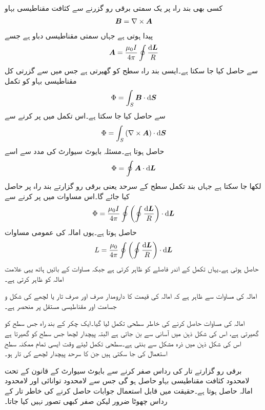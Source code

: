 کسی بھی بند راہ پر یک سمتی برقی رو  گزرنے سے کثافت مقناطیسی بہاو 
\begin{align*}
{\ensuremath{{\boldsymbol{B}}}}=\nabla \times {\ensuremath{{\boldsymbol{A}}}}
\end{align*}
 پیدا ہوتی  ہے جہاں  سمتی مقناطیسی دباو ہے جسے
\begin{align*}
\kvec{A}=\frac{\mu_0 I}{4\pi}\oint \frac{\dif \kvec{L}}{R}
\end{align*}
سے حاصل کیا جا سکتا ہے۔ایسی بند راہ سطح  کو گھیرتی ہے جس میں سے گزرتی کل مقناطیسی بہاو   کو تکمل
\begin{align*}
\Phi=\int_S \kvec{B} \cdot \dif \kvec{S}
\end{align*}
سے حاصل کیا جا سکتا ہے۔اس تکمل میں  پر کرنے سے
\begin{align*}
\Phi=\int_S \left(\nabla \times \kvec{A}  \right) \cdot \dif \kvec{S}
\end{align*}   
حاصل ہوتا ہے۔مسئلہ بایوٹ سیوارٹ کی مدد سے اسے
\begin{align*}
\Phi=\oint \kvec{A} \cdot \dif \kvec{L}
\end{align*}
لکھا جا سکتا ہے جہاں بند تکمل سطح کے سرحد یعنی برقی رو گزارتے بند راہ پر حاصل کیا جائے گا۔اس مساوات میں  پر کرنے سے
\begin{align*}
\Phi=\frac{\mu_0 I}{4\pi}\oint\left(\oint \frac{\dif \kvec{L}}{R} \right) \cdot \dif \kvec{L}
\end{align*}
حاصل ہوتا ہے۔یوں امالہ کی عمومی مساوات 
\begin{align}
L=\frac{\mu_0 }{4\pi}\oint\left(\oint \frac{\dif \kvec{L}}{R} \right) \cdot \dif \kvec{L}
\end{align}
حاصل ہوتی ہے۔یہاں تکمل کے اندر  فاصلے کو ظاہر کرتی ہے جبکہ مساوات کے بائیں ہاتھ یہی علامت امالہ کو ظاہر کرتی ہے۔

امالہ کی مساوات سے ظاہر ہے کہ امالہ کی قیمت کا دارومدار صرف اور صرف تار یا لچھے کی شکل و جسامت اور مقناطیسی مستقل پر منحصر ہے۔

امالہ کی مساوات حاصل کرنے کی خاطر سطحی تکمل لیا گیا۔ایک چکر کے بند راہ جس سطح کو گھیرتی ہے، اس کی شکل ذہن میں آسانی سے بن جاتی ہے البتہ پیچدار لچھا جس سطح کو گھیرتا ہے اس کی شکل ذہن میں ذرہ مشکل سے بنتی ہے۔سطحی تکمل لیتے وقت ایسی تمام ممکنہ سطح استعمال کی جا سکتی ہیں جن کا سرحد پیچدار لچھے کی تار ہو۔

برقی رو گزارتے تار کی رداس صفر کرنے سے بایوٹ سیوارٹ کے قانون کے تحت لامحدود کثافت مقناطیسی بہاو حاصل ہو گی جس سے لامحدود توانائی اور لامحدود امالہ حاصل ہوتا ہے۔حقیقت میں قابل استعمال جوابات حاصل کرنے کی خاطر تار کے رداس  چھوٹا ضرور لیکن صفر کبھی تصور نہیں کیا جاتا۔

